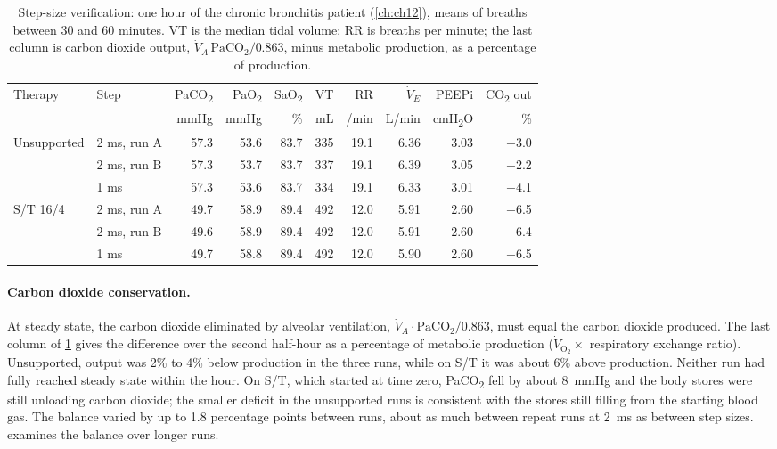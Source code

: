 \begin{table}[ht]
\centering
\caption{Step-size verification: one hour of the chronic bronchitis patient (\cref{ch:ch12}), means of breaths between 30 and 60 minutes. VT is the median tidal volume; RR is breaths per minute; the last column is carbon dioxide output, $\dot V_A\,\mathrm{PaCO_2}/0.863$, minus metabolic production, as a percentage of production.}
\label{tab:impl-dt}
\small
\setlength{\tabcolsep}{4pt}
\begin{tabular}{@{}llrrrrrrrr@{}}
\toprule
Therapy & Step & PaCO\textsubscript{2} & PaO\textsubscript{2} & SaO\textsubscript{2} & VT & RR & $\dot V_E$ & PEEPi & CO\textsubscript{2} out \\
 & & mmHg & mmHg & \% & mL & /min & L/min & cmH\textsubscript{2}O & \% \\
\midrule
Unsupported & 2 ms, run A & 57.3 & 53.6 & 83.7 & 335 & 19.1 & 6.36 & 3.03 & $-$3.0 \\
 & 2 ms, run B & 57.3 & 53.7 & 83.7 & 337 & 19.1 & 6.39 & 3.05 & $-$2.2 \\
 & 1 ms & 57.3 & 53.6 & 83.7 & 334 & 19.1 & 6.33 & 3.01 & $-$4.1 \\
\addlinespace
S/T 16/4 & 2 ms, run A & 49.7 & 58.9 & 89.4 & 492 & 12.0 & 5.91 & 2.60 & +6.5 \\
 & 2 ms, run B & 49.6 & 58.9 & 89.4 & 492 & 12.0 & 5.91 & 2.60 & +6.4 \\
 & 1 ms & 49.7 & 58.8 & 89.4 & 492 & 12.0 & 5.90 & 2.60 & +6.5 \\
\bottomrule
\end{tabular}
\end{table}


\paragraph{Carbon dioxide conservation.} At steady state, the carbon dioxide eliminated by alveolar ventilation, $\dot V_A \cdot \mathrm{PaCO_2}/0.863$, must equal the carbon dioxide produced. The last column of \cref{tab:impl-dt} gives the difference over the second half-hour as a percentage of metabolic production ($\dot V_{\mathrm{O_2}} \times$ respiratory exchange ratio). Unsupported, output was 2\% to 4\% below production in the three runs, while on S/T it was about 6\% above production. Neither run had fully reached steady state within the hour. On S/T, which started at time zero, PaCO\textsubscript{2} fell by about \SI{8}{\mmHg} and the body stores were still unloading carbon dioxide; the smaller deficit in the unsupported runs is consistent with the stores still filling from the starting blood gas. The balance varied by up to 1.8 percentage points between runs, about as much between repeat runs at \SI{2}{\milli\second} as between step sizes.  examines the balance over longer runs.

